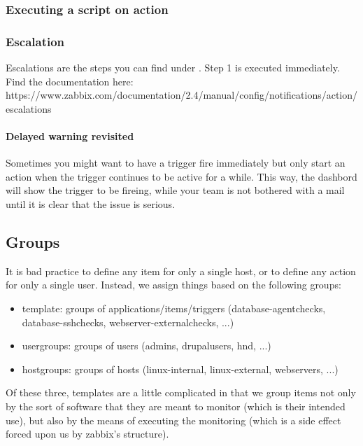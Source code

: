 \subsubsection{Executing a script on action}

\subsubsection{Escalation}
Escalations are the steps you can find under .
Step 1 is executed immediately. Find the documentation here: https://www.zabbix.com/documentation/2.4/manual/config/notifications/action/escalations

\paragraph{Delayed warning revisited} Sometimes you might want to have a trigger fire immediately but only start an action when the trigger continues to be active for a while. This way, the dashbord will show the trigger to be fireing, while your team is not bothered with a mail until it is clear that the issue is serious. 


\subsection{Groups}

It is bad practice to define any item for only a single host, or to define any action for only a single user. Instead, we assign things based on the following groups:

\begin{itemize}
    \item template: groups of applications/items/triggers (database-agentchecks, database-sshchecks, webserver-externalchecks, ...)
    \item usergroups: groups of users (admins, drupalusers, hnd, ...)
    \item hostgroups: groups of hosts (linux-internal, linux-external, webservers, ...)
\end{itemize}

Of these three, templates are a little complicated in that we group items not only by the sort of software that they are meant to monitor (which is their intended use), but also by the means of executing the monitoring  (which is a side effect forced upon us by zabbix's structure).


